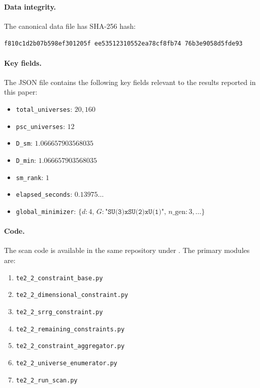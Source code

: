 \documentclass[11pt,twocolumn]{article}
\theoremstyle{remark}
\begin{document}
\paragraph{Data integrity.}
The canonical data file has SHA-256 hash:
\begin{center}
\small\texttt{f810c1d2\allowbreak b07b598e\allowbreak f301205f\allowbreak
ee535123\allowbreak 10552ea7\allowbreak 8cf8fb74\allowbreak
76b3e905\allowbreak 8d5fde93}
\end{center}

\paragraph{Key fields.}
The JSON file contains the following key fields relevant to
the results reported in this paper:
\begin{itemize}
  \item \texttt{total\_universes}: $20{,}160$
  \item \texttt{psc\_universes}: $12$
  \item \texttt{D\_sm}: $1.066657903568035$
  \item \texttt{D\_min}: $1.066657903568035$
  \item \texttt{sm\_rank}: $1$
  \item \texttt{elapsed\_seconds}: $0.13975\ldots$
  \item \texttt{global\_minimizer}: \small$\{d{:}4,\,
        G{:}\texttt{"SU(3)xSU(2)xU(1)"},\,
        n\_\mathrm{gen}{:}3,\ldots\}$\normalsize
\end{itemize}

\paragraph{Code.}
The scan code is available in the same repository under
.
The primary modules are:
\begin{enumerate}
  \item \texttt{te2\_2\_constraint\_base.py}
  \item \texttt{te2\_2\_dimensional\_constraint.py}
  \item \texttt{te2\_2\_srrg\_constraint.py}
  \item \texttt{te2\_2\_remaining\_constraints.py}
  \item \texttt{te2\_2\_constraint\_aggregator.py}
  \item \texttt{te2\_2\_universe\_enumerator.py}
  \item \texttt{te2\_2\_run\_scan.py}
\end{enumerate}
\end{document}
